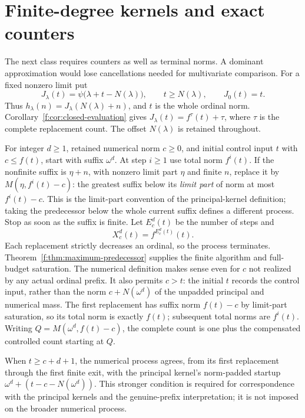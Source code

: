 \section{Finite-degree kernels and exact counters}
\label{m:sec:polynomial-kernels}
The next class requires counters as well as terminal norms. A dominant
approximation would lose cancellations needed for multivariate comparison.
For a fixed nonzero limit put
\begin{equation}\label{m:eq:J}
 J_\lambda(t)=\psi\bigl(\lambda+t-N(\lambda)\bigr),
 \qquad t\ge N(\lambda),\qquad J_0(t)=t.
\end{equation}
Thus $h_\lambda(n)=J_\lambda(N(\lambda)+n)$, and $t$ is the
whole ordinal norm.  Corollary~\ref{f:cor:closed-evaluation} gives
$J_\lambda(t)=f^\tau(t)+\tau$, where $\tau$ is the complete
replacement count.  The offset $N(\lambda)$ is retained throughout.

For integer $d\ge1$, retained numerical norm $c\ge0$, and initial control
input $t$ with $c\le f(t)$, start with suffix $\omega^d$.
At step $i\ge1$ use total norm $f^i(t)$. If the nonfinite suffix is $\eta+n$, with nonzero limit
part $\eta$ and finite $n$, replace it by $M(\eta,f^i(t)-c)$: the greatest
suffix below its \emph{limit part} of norm at most $f^i(t)-c$.
This is the limit-part convention of the principal-kernel definition; taking
the predecessor below the whole current suffix defines a different process.
Stop as soon as the suffix is finite. Let $E^d_c(t)$ be the number of
steps and
\[
 X^d_c(t)=f^{E^d_c(t)}(t).
\]
Each replacement strictly decreases an ordinal, so the process terminates.
Theorem~\ref{f:thm:maximum-predecessor} supplies the
finite algorithm and full-budget saturation. The numerical definition makes
sense even for $c$ not realized by any actual ordinal prefix.
It also permits $c>t$: the initial $t$ records the control input, rather
than the norm $c+N(\omega^d)$ of the unpadded principal and numerical mass.
The first replacement has suffix norm $f(t)-c$ by limit-part saturation,
so its total norm is exactly $f(t)$; subsequent total norms are $f^i(t)$.
Writing $Q=M(\omega^d,f(t)-c)$, the complete count is one plus the
compensated controlled count starting at $Q$.

When $t\ge c+d+1$, the numerical process agrees, from its first replacement
through the first finite exit, with the principal kernel's norm-padded startup
$\omega^d+(t-c-N(\omega^d))$. This stronger condition is required for
correspondence with the principal kernels and the genuine-prefix interpretation; it is not
imposed on the broader numerical process.

